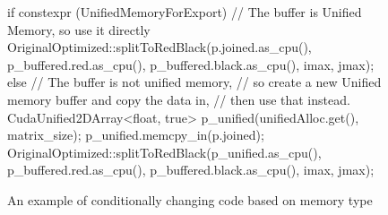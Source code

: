 \begin{figure}[ht]
    \centering
    \begin{cppcode}
if constexpr (UnifiedMemoryForExport) {
    // The buffer is Unified Memory, so use it directly
    OriginalOptimized::splitToRedBlack(p.joined.as_cpu(),
                                       p_buffered.red.as_cpu(),
                                       p_buffered.black.as_cpu(),
                                       imax, jmax);
} else {
    // The buffer is not unified memory, 
    // so create a new Unified memory buffer and copy the data in,
    // then use that instead.
    CudaUnified2DArray<float, true> p_unified(unifiedAlloc.get(), matrix_size);
    p_unified.memcpy_in(p.joined);
    OriginalOptimized::splitToRedBlack(p_unified.as_cpu(),
                                       p_buffered.red.as_cpu(),
                                       p_buffered.black.as_cpu(),
                                       imax, jmax);
}\end{cppcode}
    \caption{An example of conditionally changing code based on memory type}
    \label{fig:TemplatedMemoryUsage}
\end{figure}